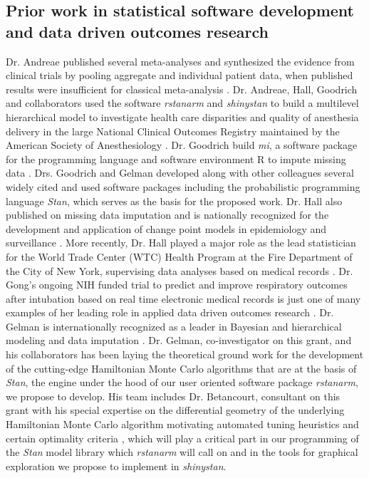 \documentclass[11pt,notitlepage]{article}
\begin{document}
\subsection*{Prior work in statistical software development and data driven outcomes research}
 
Dr. Andreae published several meta-analyses and synthesized the evidence 
from clinical trials by pooling aggregate and individual patient data, when 
published results were insufficient for classical meta-analysis 
\cite{AndreaeJohnsonAbstract2013, Andreae2013, Andreae2015, Carter2015, Atchabahian2015}. Dr. Andreae, Hall, Goodrich and 
collaborators used the software \textit{rstanarm} and \textit{shinystan} to build a multilevel 
hierarchical model to investigate health care disparities and quality of 
anesthesia delivery in the large National Clinical Outcomes Registry maintained 
by the American Society of Anesthesiology \cite{AndreaeWhite2015}. Dr. Goodrich 
build \textit{mi}, a software package for the programming language and 
software environment R to impute missing data \cite{miCRAN}. Drs. Goodrich 
and Gelman developed along with other colleagues several widely cited and used software packages 
including the probabilistic programming language \textit{Stan}\cite{Stan_Software_2014}, 
which serves as the basis for the proposed work. Dr. Hall also published on missing data 
imputation \cite{Hall2009a, Wang_20029935, Wang_20029935} and is nationally 
recognized for the development and application of change point models in 
epidemiology and surveillance 
\cite{Hall2000, Hall2001, Hall2003bayesian, Hall2009, Hall2015}. 
More recently, Dr. Hall played a major role as the lead statistician 
for the World Trade Center (WTC) Health Program at the Fire Department 
of the City of New York, supervising data analyses based on medical 
records \cite{Aldrich2010, Hall2015, Zeig-Owens2011}.  
Dr. Gong's ongoing NIH funded trial to predict and improve 
respiratory outcomes after intubation based on real time 
electronic medical records is just one of many examples of her 
leading role in applied data driven outcomes research 
\cite{Gong2005, Gong2010, Gajic2011, Yu_24970344, Kor2014}. 
Dr. Gelman is internationally recognized as a leader in Bayesian and hierarchical 
modeling and data imputation 
\cite{Gelman1998notasked, Gelman2001imputation, Hoffman2014, Gelman-Hill_2014}. 
Dr. Gelman, co-investigator on this grant, and his collaborators has been laying the 
theoretical ground work for the development of the cutting-edge Hamiltonian 
Monte Carlo algorithms \cite{Hoffman2014,Stan_Software_2014} 
that are at the basis of \textit{Stan}, the engine 
under the hood of our user oriented software package \textit{rstanarm}, 
we propose to develop. His team includes Dr. Betancourt, 
consultant on this grant with his special expertise on the differential 
geometry of the underlying Hamiltonian Monte Carlo algorithm
motivating automated tuning heuristics and certain optimality criteria 
\cite{BetancourtGeometry2016}, which will play a 
critical part in our programming of the \textit{Stan} model library 
which \textit{rstanarm} will call on and in the tools for graphical exploration
we propose to implement in \textit{shinystan}.
\end{document}
